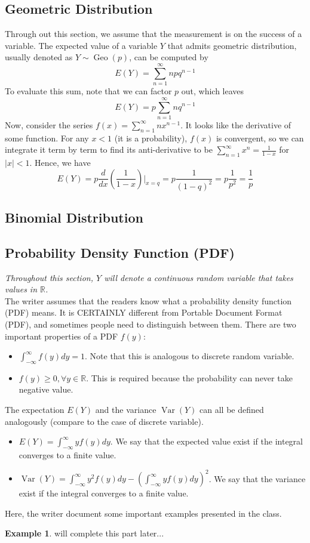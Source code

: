 \documentclass{article}
\theoremstyle{definition}
\theoremstyle{definition}
\theoremstyle{definition}
\theoremstyle{definition}
\theoremstyle{definition}
\theoremstyle{definition}
\newtheorem{example}{Example}
\theoremstyle{definition}
\theoremstyle{definition}
\theoremstyle{definition}
\newcommand{\RR}{\mathbb{R}}
\newcommand{\Geo}{\operatorname{Geo}}
\begin{document}
\subsection{Geometric Distribution}
Through out this section, we assume that the measurement is on the success of a variable.
The expected value of a variable $Y$ that admits geometric distribution, usually denoted as $Y\sim \Geo(p)$, can be computed by
\[
E(Y)=\sum_{n=1}^\infty npq^{n-1}  
\]
To evaluate this sum, note that we can factor $p$ out, which leaves 
\[
E(Y)=p\sum_{n=1}^\infty nq^{n-1}    
\]
Now, consider the series $f(x)=\sum_{n=1}^\infty nx^{n-1}$. It looks like the derivative of some function. For any $x<1$ (it is a probability), $f(x)$ is convergent,
so we can integrate it term by term to find its anti-derivative to be $\sum_{n=1}^\infty x^n=\frac{1}{1-x}$ for $|x|<1$.
Hence, we have
\[
E(Y)=p\dfrac{d}{dx}\left(\dfrac{1}{1-x}\right)\Bigg|_{x=q}=p\dfrac{1}{(1-q)^2}=p\dfrac{1}{p^2}=\dfrac{1}{p}  
\]
\subsection{Binomial Distribution}
\subsection{Probability Density Function (PDF)}
\textit{Throughout this section, $Y$ will denote a continuous random variable that takes values in $\RR$.}\\
The writer assumes that the readers know what a probability density function (PDF) means. It is CERTAINLY different from Portable Document Format (PDF), and sometimes people need to distinguish between them.
There are two important properties of a PDF $f(y)$:
\begin{itemize}
    \item $\int_{-\infty}^\infty f(y)dy=1$. Note that this is analogous to discrete random variable.
    \item $f(y)\ge 0,\forall y\in\RR$. This is required because the probability can never take negative value.
\end{itemize}
The expectation $E(Y)$ and the variance $\operatorname{Var}(Y)$ can all be defined analogously (compare to the case of discrete variable).
\begin{itemize}
    \item $E(Y)=\int_{-\infty}^\infty yf(y)dy$. We say that the expected value exist if the integral converges to a finite value.
    \item $\operatorname{Var}(Y)=\int_{-\infty}^\infty y^2f(y)dy-\left(\int_{-\infty}^\infty yf(y)dy\right)^2$. We say that the variance exist if the integral converges to a finite value.
\end{itemize}
Here, the writer document some important examples presented in the class.
\begin{example}
    will complete this part later...
\end{example}
\end{document}
